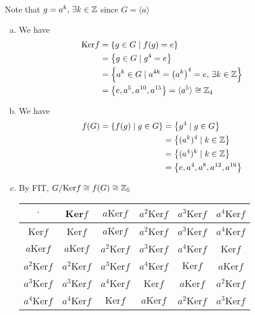 \begin{solution} 
Note that $g = a^k, \, \exists k \in \mathbb{Z}$ since $G = \langle a \rangle$
    \begin{enumerate}[(a)]
        \item We have
        \begin{align*}
            \text{Ker}f &= \qty{g \in G \mid f(g) = e} \\
            &= \qty{g \in G \mid g^4 =e} \\
            &= \qty{a^k \in G \mid a^{4k} = \qty(a^k)^4 = e, \, \exists k \in \mathbb{Z}} \\
            &= \qty{e, a^5, a^{10}, a^{15}} = \langle a^5 \rangle \cong \mathbb{Z}_4
        \end{align*}
        \item We have
        \begin{align*}
            f(G) = \qty{f(g) \mid g \in G} &= \qty{g^4 \mid g \in G} \\
            &= \qty{(a^k)^4 \mid k \in \mathbb{Z}} \\
            &= \qty{(a^4)^k \mid k \in \mathbb{Z}} \\
            &= \qty{e, a^4, a^8, a^{12}, a^{16}}
        \end{align*}
        \item  By FIT, $G/\text{Ker}f \cong f(G) \cong \mathbb{Z}_5$
        
        \begin{center}
            \begin{tabular}{c|c c c c c}
                $\cdot$  & Ker$f$ & $a\text{Ker}f$ & $a^2\text{Ker}f$ & $a^3\text{Ker}f$ & $a^4\text{Ker}f$  \\
                \hline 
                Ker$f$ & Ker$f$ & $a\text{Ker}f$ & $a^2\text{Ker}f$ & $a^3\text{Ker}f$ & $a^4\text{Ker}f$ \\
                $a\text{Ker}f$  & $a\text{Ker}f$ & $a^2\text{Ker}f$ & $a^3\text{Ker}f$ & $a^4\text{Ker}f$ & Ker$f$ \\
                $a^2\text{Ker}f$  & $a^2\text{Ker}f$ & $a^3\text{Ker}f$ & $a^4\text{Ker}f$ & $\text{Ker}f$ & $a$Ker$f$ \\
                $a^3\text{Ker}f$ & $a^3\text{Ker}f$ & $a^4\text{Ker}f$ & Ker$f$ & $a$Ker$f$ & $a^2\text{Ker}f$ \\
                $a^4\text{Ker}f$  & $a^4\text{Ker}f$ & $\text{Ker}f$ & $a\text{Ker}f$ & $a^2\text{Ker}f$ & $a^3$Ker$f$ \\
                \hline
            \end{tabular}
        \end{center}
    \end{enumerate}
\end{solution}